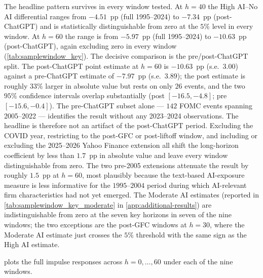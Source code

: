 The headline pattern survives in every window tested. At $h = 40$
the High AI--No AI differential ranges from $-4.51$~pp (full
1995--2024) to $-7.34$~pp (post-ChatGPT) and is statistically
distinguishable from zero at the $5\%$ level in every window. At
$h = 60$ the range is from $-5.97$~pp (full 1995--2024) to
$-10.63$~pp (post-ChatGPT), again excluding zero in every window
(\cref{tab:samplewindow_key}). The decisive comparison is the
pre/post-ChatGPT split. The post-ChatGPT point estimate at $h = 60$
is $-10.63$~pp (s.e.~$3.00$) against a pre-ChatGPT estimate of
$-7.97$~pp (s.e.~$3.89$); the post estimate is roughly $33\%$ larger
in absolute value but rests on only $26$ events, and the two $95\%$
confidence intervals overlap substantially (post $[-16.5, -4.8]$;
pre $[-15.6, -0.4]$). The pre-ChatGPT subset alone --- $142$ FOMC
events spanning 2005--2022 --- identifies the result without any
2023--2024 observations. The headline is therefore not an artifact
of the post-ChatGPT period. Excluding the COVID year, restricting to
the post-GFC or post-liftoff window, and including or excluding the
2025--2026 Yahoo Finance extension all shift the long-horizon
coefficient by less than $1.7$~pp in absolute value and leave every
window distinguishable from zero. The two pre-2005 extensions
attenuate the result by roughly $1.5$~pp at $h = 60$, most plausibly
because the text-based AI-exposure measure is less informative for
the $1995$--$2004$ period during which AI-relevant firm
characteristics had not yet emerged. The Moderate AI estimates
(reported in \cref{tab:samplewindow_key_moderate} in
\cref{app:additional-results}) are indistinguishable from zero at the
seven key horizons in seven of the nine windows; the two exceptions
are the post-GFC windows at $h = 30$, where the Moderate AI estimate
just crosses the $5\%$ threshold with the same sign as the High AI
estimate.

 plots the full impulse responses across
$h = 0,\ldots,60$ under each of the nine windows.

